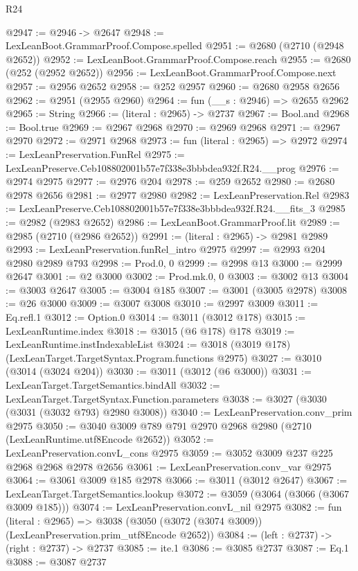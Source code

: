 \begin{lexlean}{R24}
\begin{coremodule}
@2947 := @2946 -> @2647
@2948 := LexLeanBoot.GrammarProof.Compose.spelled
@2951 := @2680 (@2710 (@2948 @2652))
@2952 := LexLeanBoot.GrammarProof.Compose.reach
@2955 := @2680 (@252 (@2952 @2652))
@2956 := LexLeanBoot.GrammarProof.Compose.next
@2957 := @2956 @2652
@2958 := @252 @2957
@2960 := @2680 @2958 @2656
@2962 := @2951 (@2955 @2960)
@2964 := fun (__s : @2946) => @2655 @2962
@2965 := String
@2966 := (literal : @2965) -> @2737
@2967 := Bool.and
@2968 := Bool.true
@2969 := @2967 @2968
@2970 := @2969 @2968
@2971 := @2967 @2970
@2972 := @2971 @2968
@2973 := fun (literal : @2965) => @2972
@2974 := LexLeanPreservation.FunRel
@2975 := LexLeanPreserve.Ceb108802001b57e7f338e3bbbdea932f.R24.__prog
@2976 := @2974 @2975
@2977 := @2976 @204
@2978 := @259 @2652
@2980 := @2680 @2978 @2656
@2981 := @2977 @2980
@2982 := LexLeanPreservation.Rel
@2983 := LexLeanPreserve.Ceb108802001b57e7f338e3bbbdea932f.R24.__fits_3
@2985 := @2982 (@2983 @2652)
@2986 := LexLeanBoot.GrammarProof.lit
@2989 := @2985 (@2710 (@2986 @2652))
@2991 := (literal : @2965) -> @2981 @2989
@2993 := LexLeanPreservation.funRel_intro @2975
@2997 := @2993 @204 @2980 @2989 @793
@2998 := Prod.{0, 0}
@2999 := @2998 @13
@3000 := @2999 @2647
@3001 := @2 @3000
@3002 := Prod.mk.{0, 0}
@3003 := @3002 @13
@3004 := @3003 @2647
@3005 := @3004 @185
@3007 := @3001 (@3005 @2978)
@3008 := @26 @3000
@3009 := @3007 @3008
@3010 := @2997 @3009
@3011 := Eq.refl.{1}
@3012 := Option.{0}
@3014 := @3011 (@3012 @178)
@3015 := LexLeanRuntime.index
@3018 := @3015 (@6 @178) @178
@3019 := LexLeanRuntime.instIndexableList
@3024 := @3018 (@3019 @178) (LexLeanTarget.TargetSyntax.Program.functions @2975)
@3027 := @3010 (@3014 (@3024 @204))
@3030 := @3011 (@3012 (@6 @3000))
@3031 := LexLeanTarget.TargetSemantics.bindAll
@3032 := LexLeanTarget.TargetSyntax.Function.parameters
@3038 := @3027 (@3030 (@3031 (@3032 @793) @2980 @3008))
@3040 := LexLeanPreservation.conv_prim @2975
@3050 := @3040 @3009 @789 @791 @2970 @2968 @2980 (@2710 (LexLeanRuntime.utf8Encode @2652))
@3052 := LexLeanPreservation.convL_cons @2975
@3059 := @3052 @3009 @237 @225 @2968 @2968 @2978 @2656
@3061 := LexLeanPreservation.conv_var @2975
@3064 := @3061 @3009 @185 @2978
@3066 := @3011 (@3012 @2647)
@3067 := LexLeanTarget.TargetSemantics.lookup
@3072 := @3059 (@3064 (@3066 (@3067 @3009 @185)))
@3074 := LexLeanPreservation.convL_nil @2975
@3082 := fun (literal : @2965) =>
  @3038 (@3050 (@3072 (@3074 @3009)) (LexLeanPreservation.prim_utf8Encode @2652))
@3084 := (left : @2737) -> (right : @2737) -> @2737
@3085 := ite.{1}
@3086 := @3085 @2737
@3087 := Eq.{1}
@3088 := @3087 @2737

\end{coremodule}
\end{lexlean}
